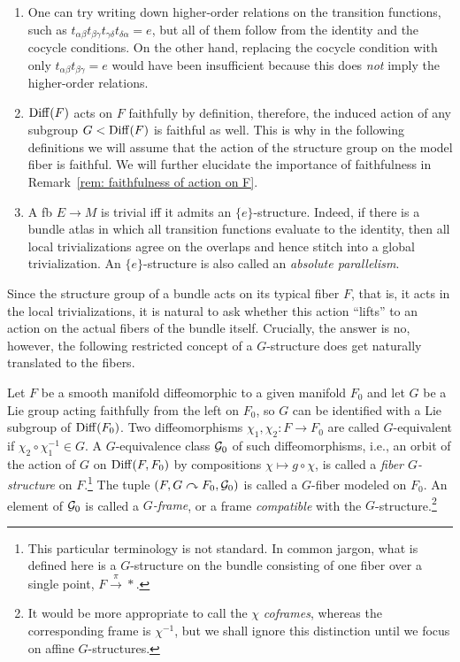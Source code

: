 \begin{rem}\label{rem: faithful action on F 0}
    \begin{enumerate}
        \item One can try writing down higher-order relations on the transition functions, such as $t_{\alpha\beta}t_{\beta\gamma}t_{\gamma\delta}t_{\delta\alpha}=e$, but all of them follow from the identity and the cocycle conditions. On the other hand, replacing the cocycle condition with only $t_{\alpha\beta}t_{\beta\gamma}=e$ would have been insufficient because this does \emph{not} imply the higher-order relations.
        \item $\operatorname{Diff}(F)$ acts on $F$ faithfully by definition, therefore, the induced action of any subgroup $G<\operatorname{Diff}(F)$ is faithful as well. This is why in the following definitions we will assume that the action of the structure group on the model fiber is faithful. We will further elucidate the importance of faithfulness in Remark~\ref{rem: faithfulness of action on F}.
        \item A \gls{fb} $E\to M$ is trivial iff it admits an $\{e\}$-structure. Indeed, if there is a bundle atlas in which all transition functions evaluate to the identity, then all local trivializations agree on the overlaps and hence stitch into a global trivialization. An $\{e\}$-structure is also called an \emph{absolute parallelism}.
    \end{enumerate}
\end{rem}


Since the structure group of a bundle acts on its typical fiber $F$, that is, it acts in the local trivializations, it is natural to ask whether this action ``lifts'' to an action on the actual fibers of the bundle itself. Crucially, the answer is no, however, the following restricted concept of a $G$-structure does get naturally translated to the fibers.

\begin{defn}[$G$-fiber]
    Let $F$ be a smooth manifold diffeomorphic to a given manifold $F_0$ and let $G$ be a Lie group acting faithfully from the left on $F_0$, so $G$ can be identified with a Lie subgroup of $\operatorname{Diff}(F_0)$. Two diffeomorphisms $\chi_1,\chi_2:F\to F_0$ are called $G$-equivalent if $\chi_2\circ \chi_1^{-1}\in G$. A $G$-equivalence class $\mathcal{G}_0$ of such diffeomorphisms, i.e., an orbit of the action of $G$ on $\operatorname{Diff}(F,F_0)$ by compositions $\chi\mapsto g\circ \chi$, is called a \emph{fiber $G$-structure} on $F$.\footnote{This particular terminology is not standard. In common jargon, what is defined here is a $G$-structure on the bundle consisting of one fiber over a single point, $F\overset{\pi}{\to}\ast$.} The tuple $(F,G\curvearrowright F_0,\mathcal{G}_0)$ is called a $G$-fiber modeled on $F_0$. An element of $\mathcal{G}_0$ is called a \emph{$G$-frame}, or a frame \emph{compatible} with the $G$-structure.\footnote{It would be more appropriate to call the $\chi$ \emph{coframes}, whereas the corresponding frame is $\chi^{-1}$, but we shall ignore this distinction until we focus on affine $G$-structures.} 
\end{defn}



